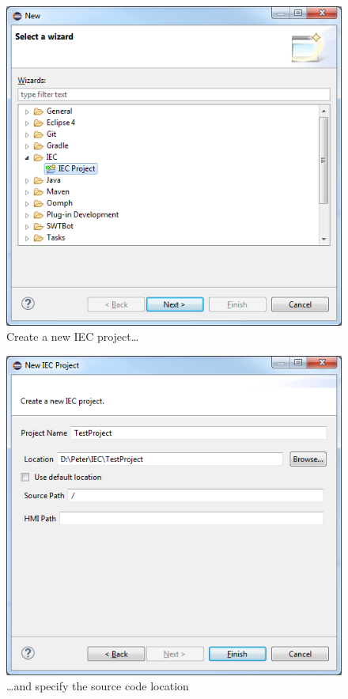 \begin{figure}[hp]
  \centering
    \includegraphics[scale=0.55]{bilder/manual-new_project1}
  \caption{Create a new IEC project\ldots}
  \label{fig:manual-new_project1}
\end{figure}

\begin{figure}[hp]
\centering
\includegraphics[scale=0.55]{bilder/manual-new_project2}
\caption{\ldots{}and specify the source code location}
\label{fig:manual-new_project2}
\end{figure}

